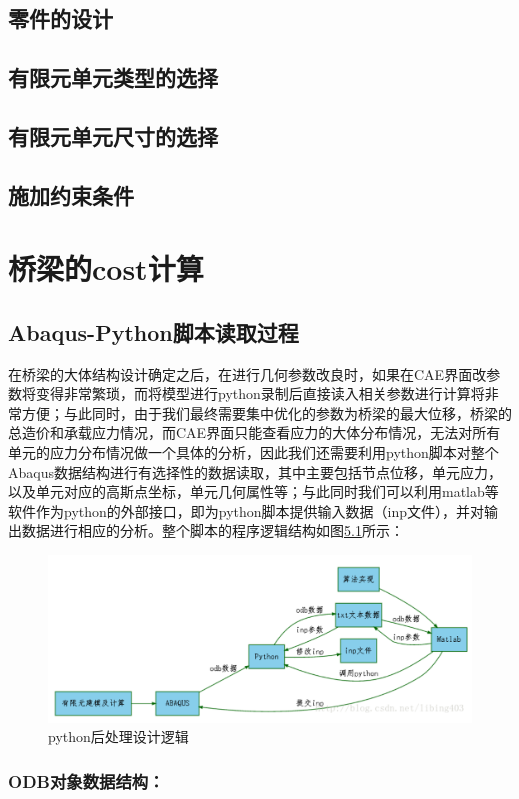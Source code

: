 \documentclass[forprint]{WHUBachelor}
\begin{document}
\section{零件的设计}
\section{有限元单元类型的选择}
\section{有限元单元尺寸的选择}
\section{施加约束条件}

\chapter{桥梁的cost计算}

\section{Abaqus-Python脚本读取过程}
在桥梁的大体结构设计确定之后，在进行几何参数改良时，如果在CAE界面改参数将变得非常繁琐，而将模型进行python录制后直接读入相关参数进行计算将非常方便；与此同时，由于我们最终需要集中优化的参数为桥梁的最大位移，桥梁的总造价和承载应力情况，而CAE界面只能查看应力的大体分布情况，无法对所有单元的应力分布情况做一个具体的分析，因此我们还需要利用python脚本对整个Abaqus数据结构进行有选择性的数据读取，其中主要包括节点位移，单元应力，以及单元对应的高斯点坐标，单元几何属性等；与此同时我们可以利用matlab等软件作为python的外部接口，即为python脚本提供输入数据（inp文件），并对输出数据进行相应的分析。整个脚本的程序逻辑结构如图\ref{4-1}所示：

\begin{figure}[H]
\centering  
\includegraphics[width = .8\textwidth]{1.png} 
\caption{python后处理设计逻辑} 
\label{4-1} 
\end{figure}

\subsection{ODB对象数据结构：}
\end{document}
